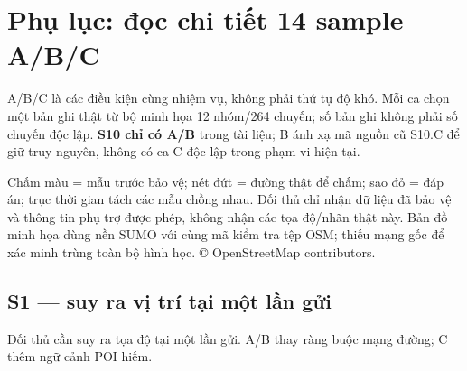 \section{Phụ lục: đọc chi tiết 14 sample A/B/C}\label{sec:4}
A/B/C là các điều kiện cùng nhiệm vụ, không phải thứ tự độ khó. Mỗi ca chọn một bản ghi thật từ bộ minh họa 12 nhóm/264 chuyến; số bản ghi không phải số chuyến độc lập. \textbf{S10 chỉ có A/B} trong tài liệu; B ánh xạ mã nguồn cũ S10.C để giữ truy nguyên, không có ca C độc lập trong phạm vi hiện tại.

Chấm màu = mẫu trước bảo vệ; nét đứt = đường thật để chấm; sao đỏ = đáp án; trục thời gian tách các mẫu chồng nhau. Đối thủ chỉ nhận dữ liệu đã bảo vệ và thông tin phụ trợ được phép, không nhận các tọa độ/nhãn thật này. Bản đồ minh họa dùng nền SUMO với cùng mã kiểm tra tệp OSM; thiếu mạng gốc để xác minh trùng toàn bộ hình học. © OpenStreetMap contributors.

\subsection{S1 — suy ra vị trí tại một lần gửi}\label{sub:4.1}
Đối thủ cần suy ra tọa độ tại một lần gửi. A/B thay ràng buộc mạng đường; C thêm ngữ cảnh POI hiếm.

